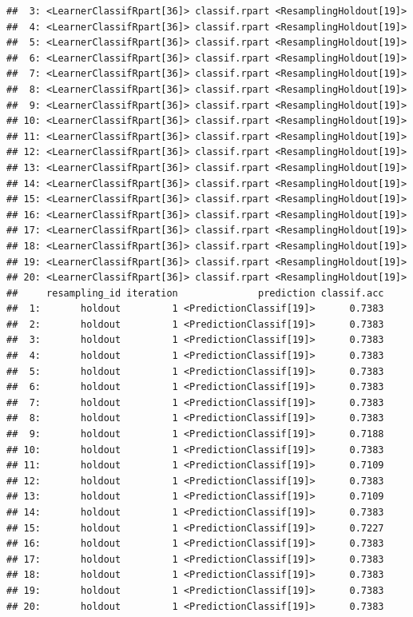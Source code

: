 \documentclass[
]{scrbook}
\begin{document}
\begin{verbatim}
##  3: <LearnerClassifRpart[36]> classif.rpart <ResamplingHoldout[19]>
##  4: <LearnerClassifRpart[36]> classif.rpart <ResamplingHoldout[19]>
##  5: <LearnerClassifRpart[36]> classif.rpart <ResamplingHoldout[19]>
##  6: <LearnerClassifRpart[36]> classif.rpart <ResamplingHoldout[19]>
##  7: <LearnerClassifRpart[36]> classif.rpart <ResamplingHoldout[19]>
##  8: <LearnerClassifRpart[36]> classif.rpart <ResamplingHoldout[19]>
##  9: <LearnerClassifRpart[36]> classif.rpart <ResamplingHoldout[19]>
## 10: <LearnerClassifRpart[36]> classif.rpart <ResamplingHoldout[19]>
## 11: <LearnerClassifRpart[36]> classif.rpart <ResamplingHoldout[19]>
## 12: <LearnerClassifRpart[36]> classif.rpart <ResamplingHoldout[19]>
## 13: <LearnerClassifRpart[36]> classif.rpart <ResamplingHoldout[19]>
## 14: <LearnerClassifRpart[36]> classif.rpart <ResamplingHoldout[19]>
## 15: <LearnerClassifRpart[36]> classif.rpart <ResamplingHoldout[19]>
## 16: <LearnerClassifRpart[36]> classif.rpart <ResamplingHoldout[19]>
## 17: <LearnerClassifRpart[36]> classif.rpart <ResamplingHoldout[19]>
## 18: <LearnerClassifRpart[36]> classif.rpart <ResamplingHoldout[19]>
## 19: <LearnerClassifRpart[36]> classif.rpart <ResamplingHoldout[19]>
## 20: <LearnerClassifRpart[36]> classif.rpart <ResamplingHoldout[19]>
##     resampling_id iteration              prediction classif.acc
##  1:       holdout         1 <PredictionClassif[19]>      0.7383
##  2:       holdout         1 <PredictionClassif[19]>      0.7383
##  3:       holdout         1 <PredictionClassif[19]>      0.7383
##  4:       holdout         1 <PredictionClassif[19]>      0.7383
##  5:       holdout         1 <PredictionClassif[19]>      0.7383
##  6:       holdout         1 <PredictionClassif[19]>      0.7383
##  7:       holdout         1 <PredictionClassif[19]>      0.7383
##  8:       holdout         1 <PredictionClassif[19]>      0.7383
##  9:       holdout         1 <PredictionClassif[19]>      0.7188
## 10:       holdout         1 <PredictionClassif[19]>      0.7383
## 11:       holdout         1 <PredictionClassif[19]>      0.7109
## 12:       holdout         1 <PredictionClassif[19]>      0.7383
## 13:       holdout         1 <PredictionClassif[19]>      0.7109
## 14:       holdout         1 <PredictionClassif[19]>      0.7383
## 15:       holdout         1 <PredictionClassif[19]>      0.7227
## 16:       holdout         1 <PredictionClassif[19]>      0.7383
## 17:       holdout         1 <PredictionClassif[19]>      0.7383
## 18:       holdout         1 <PredictionClassif[19]>      0.7383
## 19:       holdout         1 <PredictionClassif[19]>      0.7383
## 20:       holdout         1 <PredictionClassif[19]>      0.7383
\end{verbatim}
\end{document}
